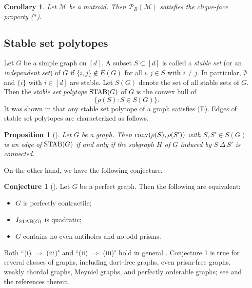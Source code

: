 \documentclass[12pt]{amsart}
\newtheorem{prop}[thm]{Proposition}
\newtheorem{cor}[thm]{Corollary}
\theoremstyle{definition}
\newtheorem{conjecture}[thm]{Conjecture}
\numberwithin{thm}{section}
\numberwithin{equation}{section}
\begin{document}
\begin{cor}
        Let $\mathcal{M}$ be a matroid.
    Then ${\mathcal P}_{B} ({\mathcal M})$ satisfies the clique-face property ($*$).
\end{cor}

\subsection{Stable set polytopes}

Let $G$ be a simple graph on $[d]$. A subset $S \subset [d]$ is called a {\em stable set} (or an {\em independent set}) of $G$
if $\{i,j\} \notin E(G)$ for all $i,j \in S$ with $i \neq j$.
In particular, $\emptyset$ and $\{i\}$ with $i \in [d]$
are stable.
Let $S(G)$ denote
the set of all stable sets of $G$.
Then the \textit{stable set polytope} ${\rm STAB}(G)$ of $G$ is 
the convex hull of
\[
\{\rho(S) : S \in S(G) \}.
\]
It was shown in \cite{propertyE} that any stable set polytope of a graph satisfies (E).
Edges of stable set polytopes are characterized as follows.

\begin{prop}[{\cite[Theorem 6.2]{C}}]
        Let $G$ be a graph.
    Then ${\rm conv}(\rho(S), \rho(S'))$ with $S, S' \in S(G)$ is an edge of ${\rm STAB}(G)$ if and only if the subgraph $H$ of $G$ induced by $S \ \Delta \ S'$ 
is connected.
\end{prop}

On the other hand, we have the following conjecture.

\begin{conjecture}[\cite{ER, OST}] \label{sspconjecture}
Let $G$ be a perfect graph.
Then the following are equivalent:
\begin{itemize}
    \item[(i)] 
    $G$ is perfectly contractile;
    \item[(ii)]
$I_{{\rm STAB}(G)}$ is quadratic;
    \item[(iii)]
    $G$ contains no even antiholes and no odd prisms.
    \end{itemize}
    
\end{conjecture}

Both ``(i) $\Longrightarrow$ (iii)" and  ``(ii) $\Longrightarrow$ (iii)" hold in general \cite{LMR, OST}.
Conjecture \ref{sspconjecture} is true for several classes of graphs,
including dart-free graphs, even prism-free graphs, 
weakly chordal graphs,
Meyniel graphs, and perfectly orderable graphs;
see \cite{OTqtr} and the references therein.
\end{document}
